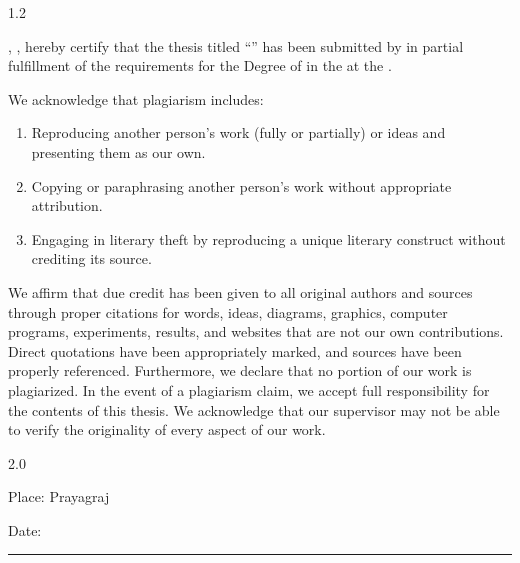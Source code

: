 \begin{spacing}{1.2}

\noindent \pronounwe, \studentnamesdeclaration, hereby certify that the thesis titled \enquote{\ttitle} has been submitted by \pronounus{} in partial fulfillment of the requirements for the Degree of \degreename{} in the \deptname{} at the \univname.

\par
\noindent We acknowledge that plagiarism includes: 
\begin{enumerate} 
    \item Reproducing another person's work (fully or partially) or ideas and presenting them as our own.
    \item Copying or paraphrasing another person's work without appropriate attribution.
    \item Engaging in literary theft by reproducing a unique literary construct without crediting its source.
\end{enumerate}
\par
We affirm that due credit has been given to all original authors and sources through proper citations for words, ideas, diagrams, graphics, computer programs, experiments, results, and websites that are not our own contributions. Direct quotations have been appropriately marked, and sources have been properly referenced. Furthermore, we declare that no portion of our work is plagiarized. In the event of a plagiarism claim, we accept full responsibility for the contents of this thesis. We acknowledge that our supervisor may not be able to verify the originality of every aspect of our work.
\end{spacing}

\begin{spacing}{2.0}
\noindent
\begin{minipage}[t]{0.4\textwidth}  
    \begin{flushleft} 
        Place: Prayagraj\\
    \end{flushleft}
\end{minipage}
\hfill
\begin{minipage}[t]{0.4\textwidth}  
    \begin{flushright}         
        Date: \rule{40mm}{0.1pt}\\       
    \end{flushright}
\end{minipage}
\par
{\studentsignatures}
\end{spacing}

